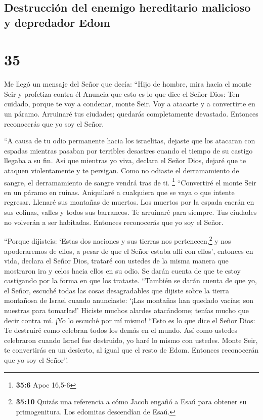 \hypertarget{destrucciuxf3n-del-enemigo-hereditario-malicioso-y-depredador-edom}{%
\subsection{Destrucción del enemigo hereditario malicioso y depredador
Edom}\label{destrucciuxf3n-del-enemigo-hereditario-malicioso-y-depredador-edom}}

\hypertarget{section-34}{%
\section{35}\label{section-34}}

 Me llegó un mensaje del Señor que decía: 
``Hijo de hombre, mira hacia el monte Seir y profetiza contra él
 Anuncia que esto es lo que dice el Señor Dios: Ten
cuidado, porque te voy a condenar, monte Seir. Voy a atacarte y a
convertirte en un páramo.  Arruinaré tus ciudades;
quedarás completamente devastado. Entonces reconocerás que yo soy el
Señor.

 ``A causa de tu odio permanente hacia los israelitas,
dejaste que los atacaran con espadas mientras pasaban por terribles
desastres cuando el tiempo de su castigo llegaba a su fin.
 Así que mientras yo viva, declara el Señor Dios, dejaré
que te ataquen violentamente y te persigan. Como no odiaste el
derramamiento de sangre, el derramamiento de sangre vendrá tras de ti.
\footnote{\textbf{35:6} Apoc 16,5-6}  ``Convertiré el
monte Seir en un páramo en ruinas. Aniquilaré a cualquiera que se vaya o
que intente regresar.  Llenaré sus montañas de muertos.
Los muertos por la espada caerán en sus colinas, valles y todos sus
barrancos.  Te arruinaré para siempre. Tus ciudades no
volverán a ser habitadas. Entonces reconocerás que yo soy el Señor.

 ``Porque dijisteis: `Estas dos naciones y sus tierras
nos pertenecen,\footnote{\textbf{35:10} Quizás una referencia a cómo
  Jacob engañó a Esaú para obtener su primogenitura. Los edomitas
  descendían de Esaú.} y nos apoderaremos de ellos, a pesar de que el
Señor estaba allí con ellos',  entonces en vida, declara
el Señor Dios, trataré con ustedes de la misma manera que mostraron ira
y celos hacia ellos en su odio. Se darán cuenta de que te estoy
castigando por la forma en que los trataste.  ``También
se darán cuenta de que yo, el Señor, escuché todas las cosas
desagradables que dijiste sobre la tierra montañosa de Israel cuando
anunciaste: `¡Las montañas han quedado vacías; son nuestras para
tomarlas!'  Hiciste muchos alardes atacándome; tenías
mucho que decir contra mí. ¡Yo lo escuché por mí mismo! 
``Esto es lo que dice el Señor Dios: Te destruiré como celebran todos
los demás en el mundo.  Así como ustedes celebraron
cuando Israel fue destruido, yo haré lo mismo con ustedes. Monte Seir,
te convertirás en un desierto, al igual que el resto de Edom. Entonces
reconocerán que yo soy el Señor''.


